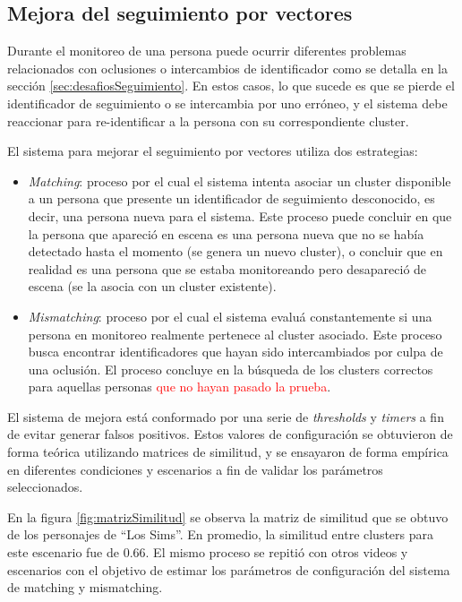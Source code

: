 \subsection{Mejora del seguimiento por vectores}

Durante el monitoreo de una persona puede ocurrir diferentes problemas relacionados con oclusiones o intercambios de identificador como se detalla en la sección \ref{sec:desafiosSeguimiento}. En estos casos, lo que sucede es que se pierde el identificador de seguimiento o se intercambia por uno erróneo, y el sistema debe reaccionar para re-identificar a la persona con su correspondiente cluster. 

\newpage

El sistema para mejorar el seguimiento por vectores utiliza dos estrategias:
\begin{itemize}
\item \textit{Matching}: proceso por el cual el sistema intenta asociar un cluster disponible a un persona que presente un identificador de seguimiento desconocido, es decir, una persona nueva para el sistema. Este proceso puede concluir en que la persona que apareció en escena es una persona nueva que no se había detectado hasta el momento (se genera un nuevo cluster), o concluir que en realidad es una persona que se estaba monitoreando pero desapareció de escena (se la asocia con un cluster existente).
\item \textit{Mismatching}: proceso por el cual el sistema evaluá constantemente si una persona en monitoreo realmente pertenece al cluster asociado. Este proceso busca encontrar identificadores que hayan sido intercambiados por culpa de una oclusión. El proceso concluye en la búsqueda de los clusters correctos para aquellas personas  \textcolor{red}{que no hayan pasado la prueba}.
\end{itemize}

El sistema de mejora está conformado por una serie de \textit{thresholds} y \textit{timers} a fin de evitar generar falsos positivos. Estos valores de configuración se obtuvieron de forma teórica utilizando matrices de similitud, y se ensayaron de forma empírica en diferentes condiciones y escenarios a fin de validar los parámetros seleccionados.

En la figura \ref{fig:matrizSimilitud} se observa la matriz de similitud que se obtuvo de los personajes de ``Los Sims''. En promedio, la similitud entre clusters para este escenario fue de 0.66. El mismo proceso se repitió con otros videos y escenarios con el objetivo de estimar los parámetros de configuración del sistema de matching y mismatching.

